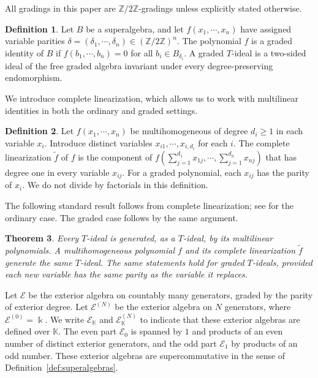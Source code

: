 \documentclass[11pt,reqno]{amsart}
\newcommand{\kk}{\Bbbk}
\newcommand{\KK}{\mathbb{K}}
\newcommand{\E}{\mathcal E}
\newcommand{\Ztwo}{\mathbb Z/2\mathbb Z}
\newtheorem{theorem}{Theorem}[section]
\theoremstyle{definition}
\newtheorem{definition}[theorem]{Definition}
\theoremstyle{remark}
\numberwithin{equation}{section}
\begin{document}
All gradings in this paper are $\Ztwo$-gradings unless
explicitly stated otherwise.

\begin{definition}\label{def:graded-identities}
Let $B$ be a superalgebra, and let $f(x_1,\cdots,x_n)$ have
assigned variable parities
$\delta=(\delta_1,\cdots,\delta_n)\in(\Ztwo)^n$.
The polynomial $f$ is a graded identity of $B$ if
$
f(b_1,\cdots,b_n)=0$ for all $b_i\in B_{\delta_i}$.
A graded $T$-ideal is a two-sided ideal of the free graded
algebra invariant under every degree-preserving endomorphism.
\end{definition}


We introduce complete linearization, which allows us to work
with multilinear identities in both the ordinary and graded settings.

\begin{definition}\label{def:linearization}
Let $f(x_1,\cdots,x_n)$ be multihomogeneous of degree $d_i\geq1$
in each variable $x_i$. Introduce distinct variables
$x_{i1},\cdots,x_{i,d_i}$ for each $i$.
The complete linearization $\widetilde f$ of $f$ is the
component of
$
f(\sum_{j=1}^{d_1}x_{1j},\cdots,
\sum_{j=1}^{d_n}x_{nj})
$
that has degree one in every variable $x_{ij}$.
For a graded polynomial, each $x_{ij}$ has the parity of $x_i$.
We do not divide by factorials in this definition.
\end{definition}

The following standard result follows from complete linearization;
see \cite{GiambrunoZaicev2005}
for the ordinary case. The graded case follows by the same argument.

\begin{theorem}\label{thm:linearization}
Every $T$-ideal is generated, as a $T$-ideal, by its
multilinear polynomials.
A multihomogeneous polynomial $f$ and its complete
linearization $\widetilde f$ generate the same $T$-ideal.
The same statements hold for graded $T$-ideals, provided
each new variable has the same parity as the variable
it replaces.
\end{theorem}


Let $\E$ be the exterior algebra on countably many generators,
graded by the parity of exterior degree. Let $\E^{(N)}$ be the
exterior algebra on $N$ generators, where $\E^{(0)}=\kk$.
We write $\E_{\KK}$ and $\E_{\KK}^{(N)}$ to indicate that these
exterior algebras are defined over $\KK$.
The even part $\E_0$ is spanned by $1$ and products of an even number of
distinct exterior generators, and the odd part $\E_1$ by products of an odd
number. These exterior algebras are supercommutative in the
sense of Definition~\ref{def:superalgebras}.
\end{document}
